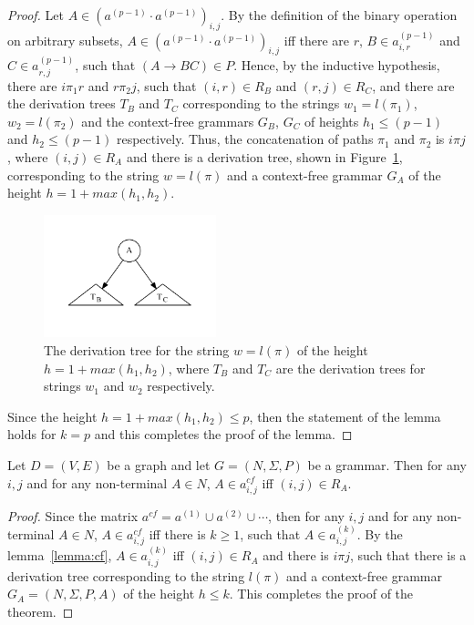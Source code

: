 \begin{proof}
Let $A \in (a^{(p-1)} \cdot a^{(p-1)})_{i,j}$. By the definition of the binary operation on arbitrary subsets, $A \in (a^{(p-1)} \cdot a^{(p-1)})_{i,j}$ iff there are $r$, $B \in a^{(p-1)}_{i,r}$ and $C \in a^{(p-1)}_{r,j}$, such that $(A \rightarrow B C) \in P$. Hence, by the inductive hypothesis, there are $i \pi_1 r$ and $r \pi_2 j$, such that $(i,r) \in R_B$ and $(r,j) \in R_C$, and there are the derivation trees $T_B$ and $T_C$ corresponding to the strings $w_1 = l(\pi_1)$, $w_2 = l(\pi_2)$ and the context-free grammars $G_B$, $G_C$ of heights $h_1 \leq (p-1)$ and $h_2 \leq (p-1)$ respectively. Thus, the concatenation of paths $\pi_1$ and $\pi_2$ is $i \pi j$, where $(i,j) \in R_A$ and there is a derivation tree, shown in Figure~\ref{tree2}, corresponding to the string $w = l(\pi)$ and a context-free grammar $G_A$ of the height $h = 1 + max(h_1, h_2)$.

\begin{figure}[h!]
 \centering
 \includegraphics[width=5cm]{pictures/tree2.pdf}
 \caption{The derivation tree for the string $w = l(\pi)$ of the height $h = 1 + max(h_1, h_2)$, where $T_B$ and $T_C$ are the derivation trees for strings $w_1$ and $w_2$ respectively.}
 \label{tree2}
\end{figure}

Since the height $h = 1 + max(h_1, h_2) \leq p$, then the statement of the lemma holds for $k = p$ and this completes the proof of the lemma.
\end{proof}

\begin{mytheorem}\label{thm:correct}
 Let $D = (V,E)$ be a graph and let $G =(N,\Sigma,P)$ be a grammar. Then for any $i, j$ and for any non-terminal $A \in N$, $A \in a^{cf}_{i,j}$ iff $(i,j) \in R_A$.
\end{mytheorem}
\begin{proof}

Since the matrix $a^{cf} = a^{(1)} \cup a^{(2)} \cup \cdots$, then for any $i, j$ and for any non-terminal $A \in N$, $A \in a^{cf}_{i,j}$ iff there is $k \geq 1$, such that $A \in a^{(k)}_{i,j}$. By the lemma~\ref{lemma:cf}, $A \in a^{(k)}_{i,j}$ iff $(i,j) \in R_A$ and there is $i \pi j$, such that there is a derivation tree corresponding to the string $l(\pi)$ and a context-free grammar $G_A = (N,\Sigma,P,A)$ of the height $h \leq k$. This completes the proof of the theorem.
\end{proof}

